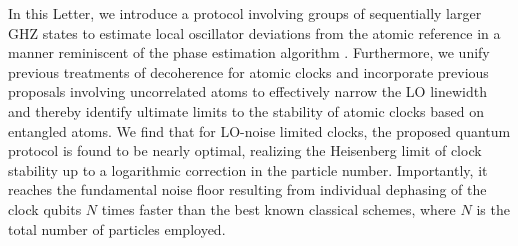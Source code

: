 In this Letter, we  introduce a protocol involving groups of sequentially larger
GHZ states to estimate local oscillator deviations from the atomic reference in
a manner reminiscent of the phase estimation algorithm \cite{Nielsen_Chuang}.
Furthermore, we unify previous treatments of decoherence for atomic clocks 
and incorporate previous proposals involving uncorrelated atoms to
effectively narrow the LO linewidth \cite{Rosenband2013, Borregaard2013} and thereby identify
 ultimate limits to the stability of atomic clocks based on entangled atoms. We find that for LO-noise limited clocks, the
proposed quantum protocol is found to be nearly optimal, realizing the
Heisenberg limit of clock stability up to a logarithmic correction in the
particle number.
Importantly, it reaches the fundamental noise floor  resulting from
individual dephasing of the clock qubits $N$ times faster than the best known
classical schemes, where $N$ is the total number of particles employed.


